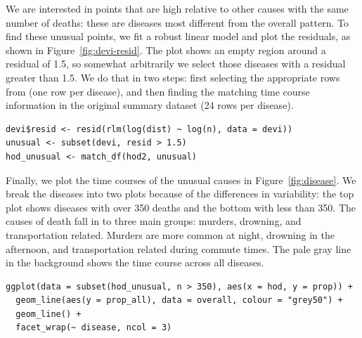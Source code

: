\documentclass[article]{jss}
\begin{document}
We are interested in points that are high relative to other causes with the same number of deaths: these are diseases most different from the overall pattern. To find these unusual points, we fit a robust linear model and plot the residuals, as shown in Figure~\ref{fig:devi-resid}. The plot shows an empty region around a residual of 1.5, so somewhat arbitrarily we select those diseases with a residual greater than 1.5. We do that in two steps: first selecting the appropriate rows from  (one row per disease), and then finding the matching time course information in the original summary dataset (24 rows per disease).

\begin{Verbatim}
devi$resid <- resid(rlm(log(dist) ~ log(n), data = devi))
unusual <- subset(devi, resid > 1.5)
hod_unusual <- match_df(hod2, unusual)
\end{Verbatim}

Finally, we plot the time courses of the unusual causes in Figure~\ref{fig:disease}. We break the diseases into two plots because of the differences in variability: the top plot shows diseases with over 350 deaths and the bottom with less than 350. The causes of death fall in to three main groups: murders, drowning, and transportation related. Murders are more common at night, drowning in the afternoon, and transportation related during commute times. The pale gray line in the background shows the time course across all diseases.

\begin{Verbatim}
ggplot(data = subset(hod_unusual, n > 350), aes(x = hod, y = prop)) + 
  geom_line(aes(y = prop_all), data = overall, colour = "grey50") +
  geom_line() + 
  facet_wrap(~ disease, ncol = 3)
\end{Verbatim}
\end{document}

